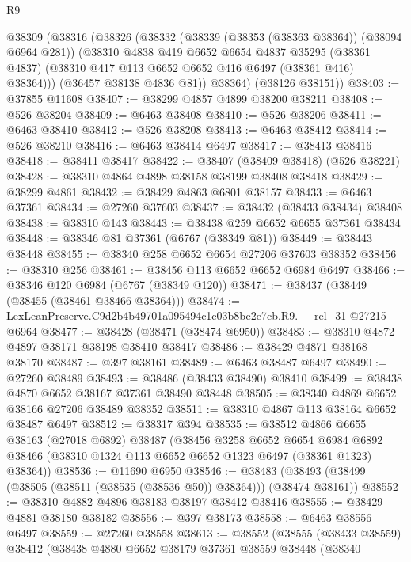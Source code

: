 \begin{lexlean}{R9}
\begin{coremodule}
    @38309
      (@38316
        (@38326
          (@38332
            (@38339 (@38353 (@38363 @38364)) (@38094 @6964 @281))
            (@38310
              @4838
              @419
              @6652
              @6654
              @4837
              @35295
              (@38361 @4837)
              (@38310 @417 @113 @6652 @6652 @416 @6497 (@38361 @416) @38364)))
          (@36457 @38138 @4836 @81))
        @38364)
      (@38126 @38151))
@38403 := @37855 @11608
@38407 := @38299 @4857 @4899 @38200 @38211
@38408 := @526 @38204
@38409 := @6463 @38408
@38410 := @526 @38206
@38411 := @6463 @38410
@38412 := @526 @38208
@38413 := @6463 @38412
@38414 := @526 @38210
@38416 := @6463 @38414 @6497
@38417 := @38413 @38416
@38418 := @38411 @38417
@38422 := @38407 (@38409 @38418) (@526 @38221)
@38428 := @38310 @4864 @4898 @38158 @38199 @38408 @38418
@38429 := @38299 @4861
@38432 := @38429 @4863 @6801 @38157
@38433 := @6463 @37361
@38434 := @27260 @37603
@38437 := @38432 (@38433 @38434) @38408
@38438 := @38310 @143
@38443 := @38438 @259 @6652 @6655 @37361 @38434
@38448 := @38346 @81 @37361 (@6767 (@38349 @81))
@38449 := @38443 @38448
@38455 := @38340 @258 @6652 @6654 @27206 @37603 @38352
@38456 := @38310 @256
@38461 := @38456 @113 @6652 @6652 @6984 @6497
@38466 := @38346 @120 @6984 (@6767 (@38349 @120))
@38471 := @38437 (@38449 (@38455 (@38461 @38466 @38364)))
@38474 := LexLeanPreserve.C9d2b4b49701a095494c1c03b8be2e7cb.R9.__rel_31 @27215 @6964
@38477 := @38428 (@38471 (@38474 @6950))
@38483 := @38310 @4872 @4897 @38171 @38198 @38410 @38417
@38486 := @38429 @4871 @38168 @38170
@38487 := @397 @38161
@38489 := @6463 @38487 @6497
@38490 := @27260 @38489
@38493 := @38486 (@38433 @38490) @38410
@38499 := @38438 @4870 @6652 @38167 @37361 @38490 @38448
@38505 := @38340 @4869 @6652 @38166 @27206 @38489 @38352
@38511 := @38310 @4867 @113 @38164 @6652 @38487 @6497
@38512 := @38317 @394
@38535 := @38512
    @4866
    @6655
    @38163
    (@27018 @6892)
    @38487
    (@38456
      @3258
      @6652
      @6654
      @6984
      @6892
      @38466
      (@38310 @1324 @113 @6652 @6652 @1323 @6497 (@38361 @1323) @38364))
@38536 := @11690 @6950
@38546 := @38483 (@38493 (@38499 (@38505 (@38511 (@38535 (@38536 @50)) @38364))) (@38474 @38161))
@38552 := @38310 @4882 @4896 @38183 @38197 @38412 @38416
@38555 := @38429 @4881 @38180 @38182
@38556 := @397 @38173
@38558 := @6463 @38556 @6497
@38559 := @27260 @38558
@38613 := @38552
    (@38555
      (@38433 @38559)
      @38412
      (@38438
        @4880
        @6652
        @38179
        @37361
        @38559
        @38448
        (@38340

\end{coremodule}
\end{lexlean}
